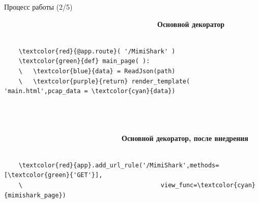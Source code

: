 \documentclass[aspectratio=169]{beamer}
\begin{document}
\begin{frame}[fragile]{Процесс работы (2/5)}
\begin{minipage}{5in}
		~~~~~~~~~~~~~~~~~~~~~~~~~~~~~~~~~~~~~~~~~~~\textbf{Основной декоратор}
\begin{Verbatim}[commandchars=\\\{\}]
	
	\textcolor{red}{@app.route}( '/MimiShark' )
	\textcolor{green}{def} main_page( ):
	\   \textcolor{blue}{data} = ReadJson(path)
	\   \textcolor{purple}{return} render_template( 'main.html',pcap_data = \textcolor{cyan}{data})
		
	
	
	\end{Verbatim}
	\end{minipage}	
\begin{minipage}{5in}
			~~~~~~~~~~~~~~~~~~~~~~~~~~~~~~~~~\textbf{Основной декоратор, после внедрения}
\begin{Verbatim}[commandchars=\\\{\}]
	
	\textcolor{red}{app}.add_url_rule('/MimiShark',methods=[\textcolor{green}{'GET'}], 
	\                                      view_func=\textcolor{cyan}{mimishark_page})
		
	\end{Verbatim}
		\end{minipage} 
\end{frame}
\end{document}
